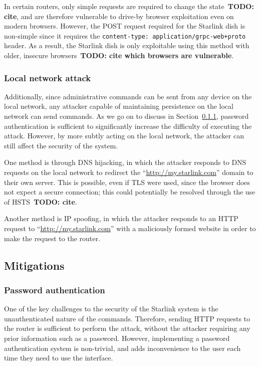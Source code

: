 In certain routers, only simple requests are required to change the state~\textbf{TODO: cite}, and are therefore vulnerable to drive-by browser exploitation even on modern browsers.
However, the POST request required for the Starlink dish is non-simple since it requires the \texttt{content-type: application/grpc-web+proto} header.
As a result, the Starlink dish is only exploitable using this method with older, insecure browsers~\textbf{TODO: cite which browsers are vulnerable}.

\subsubsection{Local network attack}

Additionally, since administrative commands can be sent from any device on the local network, any attacker capable of maintaining persistence on the local network can send commands.
As we go on to discuss in Section~\ref{sec:password_authentication}, password authentication is sufficient to significantly increase the difficulty of executing the attack.
However, by more subtly acting on the local network, the attacker can still affect the security of the system.

One method is through DNS hijacking, in which the attacker responds to DNS requests on the local network to redirect the ``\url{http://my.starlink.com}'' domain to their own server.
This is possible, even if TLS were used, since the browser does not expect a secure connection; this could potentially be resolved through the use of HSTS~\textbf{TODO: cite}.

Another method is IP spoofing, in which the attacker responds to an HTTP request to ``\url{http://my.starlink.com}'' with a maliciously formed website in order to make the request to the router.

\subsection{Mitigations}

\subsubsection{Password authentication}\label{sec:password_authentication}

One of the key challenges to the security of the Starlink system is the unauthenticated nature of the commands.
Therefore, sending HTTP requests to the router is sufficient to perform the attack, without the attacker requiring any prior information such as a password.
However, implementing a password authentication system is non-trivial, and adds inconvenience to the user each time they need to use the interface.

